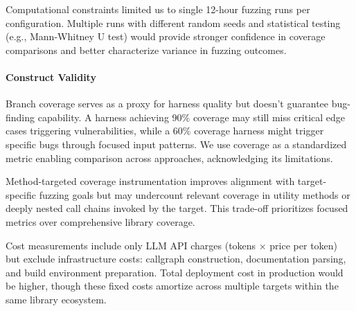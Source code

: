 Computational constraints limited us to single 12-hour fuzzing runs per configuration. Multiple runs with different random seeds and statistical testing (e.g., Mann-Whitney U test) would provide stronger confidence in coverage comparisons and better characterize variance in fuzzing outcomes.

\paragraph{Construct Validity}
Branch coverage serves as a proxy for harness quality but doesn't guarantee bug-finding capability. A harness achieving 90\% coverage may still miss critical edge cases triggering vulnerabilities, while a 60\% coverage harness might trigger specific bugs through focused input patterns. We use coverage as a standardized metric enabling comparison across approaches, acknowledging its limitations.

Method-targeted coverage instrumentation improves alignment with target-specific fuzzing goals but may undercount relevant coverage in utility methods or deeply nested call chains invoked by the target. This trade-off prioritizes focused metrics over comprehensive library coverage.

Cost measurements include only LLM API charges (tokens × price per token) but exclude infrastructure costs: callgraph construction, documentation parsing, and build environment preparation. Total deployment cost in production would be higher, though these fixed costs amortize across multiple targets within the same library ecosystem.
